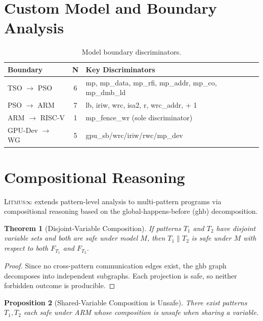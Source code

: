 \documentclass[11pt]{article}
\newcommand{\litmus}{\textsc{Litmus$\infty$}}
\newtheorem{theorem}{Theorem}
\newtheorem{proposition}[theorem]{Proposition}
\begin{document}
\section{Custom Model and Boundary Analysis}
\label{app:custom-boundary}

\begin{table}[ht]
\centering
\caption{Model boundary discriminators.}
\small
\begin{tabular}{lcp{5cm}}
\toprule
\textbf{Boundary} & \textbf{N} & \textbf{Key Discriminators} \\
\midrule
TSO $\to$ PSO & 6 & mp, mp\_data, mp\_rfi, mp\_addr, mp\_co, mp\_dmb\_ld \\
PSO $\to$ ARM & 7 & lb, iriw, wrc, isa2, r, wrc\_addr, + 1 \\
ARM $\to$ RISC-V & 1 & mp\_fence\_wr (sole discriminator) \\
GPU-Dev $\to$ WG & 5 & gpu\_sb/wrc/iriw/rwc/mp\_dev \\
\bottomrule
\end{tabular}
\end{table}

\section{Compositional Reasoning}
\label{app:compositional}

\litmus{} extends pattern-level analysis to multi-pattern programs via
compositional reasoning based on the global-happens-before (ghb)
decomposition.

\begin{theorem}[Disjoint-Variable Composition]
\label{thm:composition}
If patterns $T_1$ and $T_2$ have disjoint variable sets and both are
safe under model $M$, then $T_1 \| T_2$ is safe under $M$ with respect
to both $F_{T_1}$ and $F_{T_2}$.
\end{theorem}

\begin{proof}
Since no cross-pattern communication edges exist, the ghb graph
decomposes into independent subgraphs. Each projection is safe,
so neither forbidden outcome is producible.
\end{proof}

\begin{proposition}[Shared-Variable Composition is Unsafe]
\label{prop:unsafe-composition}
There exist patterns $T_1, T_2$ each safe under ARM whose composition
is unsafe when sharing a variable.
\end{proposition}
\end{document}

